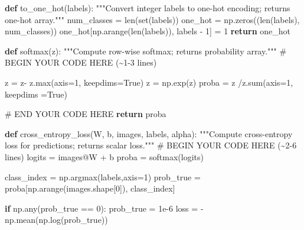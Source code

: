 \documentclass[
  letterpaper,
  DIV=11,
  numbers=noendperiod]{scrartcl}
\newenvironment{Shaded}{\begin{snugshade}}{\end{snugshade}}
\newcommand{\BuiltInTok}[1]{\textcolor[rgb]{0.00,0.23,0.31}{#1}}
\newcommand{\CommentTok}[1]{\textcolor[rgb]{0.37,0.37,0.37}{#1}}
\newcommand{\ControlFlowTok}[1]{\textcolor[rgb]{0.00,0.23,0.31}{\textbf{#1}}}
\newcommand{\DecValTok}[1]{\textcolor[rgb]{0.68,0.00,0.00}{#1}}
\newcommand{\FloatTok}[1]{\textcolor[rgb]{0.68,0.00,0.00}{#1}}
\newcommand{\KeywordTok}[1]{\textcolor[rgb]{0.00,0.23,0.31}{\textbf{#1}}}
\newcommand{\NormalTok}[1]{\textcolor[rgb]{0.00,0.23,0.31}{#1}}
\newcommand{\OperatorTok}[1]{\textcolor[rgb]{0.37,0.37,0.37}{#1}}
\newcommand{\RegionMarkerTok}[1]{\textcolor[rgb]{0.00,0.23,0.31}{#1}}
\newcommand{\VariableTok}[1]{\textcolor[rgb]{0.07,0.07,0.07}{#1}}
\begin{document}
\begin{Shaded}
\begin{Highlighting}[]
\KeywordTok{def}\NormalTok{ to\_one\_hot(labels):}
    \CommentTok{"""Convert integer labels to one{-}hot encoding; returns one{-}hot array."""}
\NormalTok{    num\_classes }\OperatorTok{=} \BuiltInTok{len}\NormalTok{(}\BuiltInTok{set}\NormalTok{(labels))}
\NormalTok{    one\_hot }\OperatorTok{=}\NormalTok{ np.zeros((}\BuiltInTok{len}\NormalTok{(labels), num\_classes))}
\NormalTok{    one\_hot[np.arange(}\BuiltInTok{len}\NormalTok{(labels)), labels }\OperatorTok{{-}} \DecValTok{1}\NormalTok{] }\OperatorTok{=} \DecValTok{1}
    \ControlFlowTok{return}\NormalTok{ one\_hot}

\KeywordTok{def}\NormalTok{ softmax(z):}
    \CommentTok{"""Compute row{-}wise softmax; returns probability array."""}
    \CommentTok{\# }\RegionMarkerTok{BEGIN}\CommentTok{ YOUR CODE HERE (\textasciitilde{}1{-}3 lines)}
    
    
\NormalTok{    z }\OperatorTok{=}\NormalTok{ z}\OperatorTok{{-}}\NormalTok{ z.}\BuiltInTok{max}\NormalTok{(axis}\OperatorTok{=}\DecValTok{1}\NormalTok{, keepdims}\OperatorTok{=}\VariableTok{True}\NormalTok{)}
\NormalTok{    z }\OperatorTok{=}\NormalTok{ np.exp(z)}
\NormalTok{    proba }\OperatorTok{=}\NormalTok{ z }\OperatorTok{/}\NormalTok{z.}\BuiltInTok{sum}\NormalTok{(axis}\OperatorTok{=}\DecValTok{1}\NormalTok{, keepdims }\OperatorTok{=}\VariableTok{True}\NormalTok{)}

    \CommentTok{\# }\RegionMarkerTok{END}\CommentTok{ YOUR CODE HERE}
    \ControlFlowTok{return}\NormalTok{ proba}


\KeywordTok{def}\NormalTok{ cross\_entropy\_loss(W, b, images, labels, alpha):}
    \CommentTok{"""Compute cross{-}entropy loss for predictions; returns scalar loss."""}
    \CommentTok{\# }\RegionMarkerTok{BEGIN}\CommentTok{ YOUR CODE HERE (\textasciitilde{}2{-}6 lines)}
\NormalTok{    logits }\OperatorTok{=}\NormalTok{  images}\OperatorTok{@}\NormalTok{W }\OperatorTok{+}\NormalTok{ b}
\NormalTok{    proba }\OperatorTok{=}\NormalTok{ softmax(logits)}

\NormalTok{    class\_index }\OperatorTok{=}\NormalTok{ np.argmax(labels,axis}\OperatorTok{=}\DecValTok{1}\NormalTok{)}
\NormalTok{    prob\_true }\OperatorTok{=}\NormalTok{ proba[np.arange(images.shape[}\DecValTok{0}\NormalTok{]), class\_index]}


    \ControlFlowTok{if}\NormalTok{ np.}\BuiltInTok{any}\NormalTok{(prob\_true }\OperatorTok{==} \DecValTok{0}\NormalTok{):}
\NormalTok{        prob\_true }\OperatorTok{=} \FloatTok{1e{-}6}
\NormalTok{        loss }\OperatorTok{=} \OperatorTok{{-}}\NormalTok{np.mean(np.log(prob\_true))}
    

\end{Highlighting}
\end{Shaded}
\end{document}
